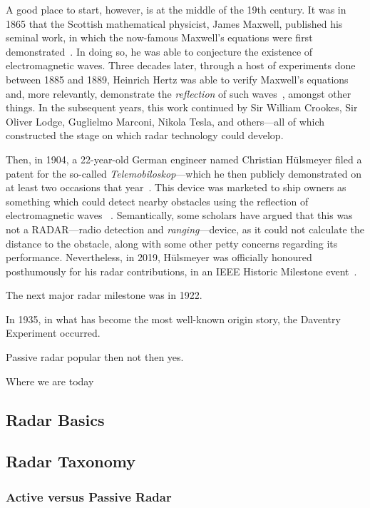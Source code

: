 \documentclass[class=report,11pt,crop=false]{standalone}
\begin{document}
A good place to start, however, is at the middle of the 19th century. It was in 1865 that the Scottish mathematical physicist, James Maxwell, published his seminal work, in which the now-famous Maxwell's equations were first demonstrated~\cite{maxwell1865viii}. In doing so, he was able to conjecture the existence of electromagnetic waves. Three decades later, through a host of experiments done between 1885 and 1889, Heinrich Hertz was able to verify Maxwell's equations and, more relevantly, demonstrate the \emph{reflection} of such waves~\cite{hertz1893electromagnetic, Cichon1995}, amongst other things. In the subsequent years, this work continued by Sir William Crookes, Sir Oliver Lodge, Guglielmo Marconi, Nikola Tesla, and others---all of which constructed the stage on which radar technology could develop.

Then, in 1904, a 22-year-old German engineer named Christian H\"ulsmeyer filed a patent for the so-called \emph{Telemobiloskop}---which he then publicly demonstrated on at least two occasions that year~\cite{Galati2014}. This device was marketed to ship owners as something which could detect nearby obstacles using the reflection of electromagnetic waves ~\cite{}. Semantically, some scholars have argued that this was not a RADAR---radio detection and \emph{ranging}---device, as it could not calculate the distance to the obstacle, along with some other petty concerns regarding its performance. Nevertheless, in 2019, H\"ulsmeyer was officially honoured posthumously for his radar contributions, in an IEEE Historic Milestone event~\cite{Griffiths2019}.

The next major radar milestone was in 1922.

In 1935, in what has become the most well-known origin story, the Daventry Experiment occurred.

Passive radar popular then not then yes.

Where we are today

\subsection{Radar Basics}

\subsection{Radar Taxonomy}
\subsubsection{Active versus Passive Radar}
\end{document}
